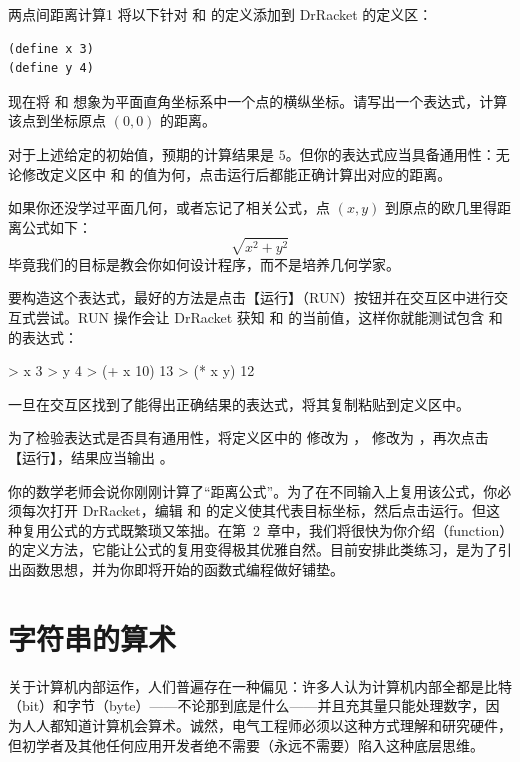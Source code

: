 \begin{exercise}{两点间距离计算}{1}
将以下针对  和  的定义添加到 DrRacket 的定义区：
\begin{lstlisting}[language=BSL]
(define x 3)
(define y 4)
\end{lstlisting}

现在将  和  想象为平面直角坐标系中一个点的横纵坐标。请写出一个表达式，计算该点到坐标原点 $(0,0)$ 的距离。

对于上述给定的初始值，预期的计算结果是 $5$。但你的表达式应当具备通用性：无论修改定义区中  和  的值为何，点击运行后都能正确计算出对应的距离。

如果你还没学过平面几何，或者忘记了相关公式，点 $(x,y)$ 到原点的欧几里得距离公式如下：
\[
  \sqrt{x^2 + y^2}
\]
毕竟我们的目标是教会你如何设计程序，而不是培养几何学家。

要构造这个表达式，最好的方法是点击【运行】（RUN）按钮并在交互区中进行交互式尝试。RUN 操作会让 DrRacket 获知  和  的当前值，这样你就能测试包含  和  的表达式：
\begin{replbox}
> x
3
> y
4
> (+ x 10)
13
> (* x y)
12
\end{replbox}

一旦在交互区找到了能得出正确结果的表达式，将其复制粘贴到定义区中。

为了检验表达式是否具有通用性，将定义区中的  修改为 ， 修改为 ，再次点击【运行】，结果应当输出 。
\end{exercise}

你的数学老师会说你刚刚计算了“距离公式”。为了在不同输入上复用该公式，你必须每次打开 DrRacket，编辑  和  的定义使其代表目标坐标，然后点击运行。但这种复用公式的方式既繁琐又笨拙。在第~2~章中，我们将很快为你介绍（function）的定义方法，它能让公式的复用变得极其优雅自然。目前安排此类练习，是为了引出函数思想，并为你即将开始的函数式编程做好铺垫。


\section{字符串的算术}
\label{sec:1.2}

关于计算机内部运作，人们普遍存在一种偏见：许多人认为计算机内部全都是比特（bit）和字节（byte）——不论那到底是什么——并且充其量只能处理数字，因为人人都知道计算机会算术。诚然，电气工程师必须以这种方式理解和研究硬件，但初学者及其他任何应用开发者绝不需要（永远不需要）陷入这种底层思维。

